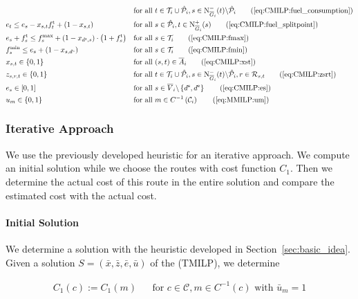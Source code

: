 \begin{align}
	& & & \text{for all } t\in\Ti\cup\Phat_i, s\in\Ninoi(t)\backslash\Phat_i \tag{\ref{eq:CMILP:fuel_consumption}} \\
	& e_t \leq e_s-x_{s,t}\ft_t+\left(1-x_{s,t}\right) && \text{for all } s\in\Phat_i,t\in\Noutoi(s) \tag{\ref{eq:CMILP:fuel_splitpoint}} \\
	& e_s + \ft_s \leq f^{\max}_s + \left(1-x_{\ds,s}\right)\cdot\left(1+\ft_s\right) && \text{for all } s\in\Ti \tag{\ref{eq:CMILP:fmax}} \\
	& f^{\min}_s \leq e_s + \left(1-x_{s,\de}\right) && \text{for all } s\in\Ti \tag{\ref{eq:CMILP:fmin}} \\
	& x_{s,t}\in\{0,1\} & & \text{for all } (s,t)\in\overline{A}_i \tag{\ref{eq:CMILP:xst}} \\
	& z_{s,r,t}\in\{0,1\} & & \text{for all } t\in\Ti\cup\Phat_i,s\in\Ninoi(t)\backslash\Phat_i,r\in\Rst \tag{\ref{eq:CMILP:zsrt}} \\
	& e_s\in[0,1] & & \text{for all } s\in\overline{V}_i\backslash\left\{\ds,\de\right\} \tag{\ref{eq:CMILP:es}} \\
	& u_m\in\{0,1\} && \text{for all } m\in C^{-1}\left(\mathcal{C}_i\right) \tag{\ref{eq:MMILP:um}}
\end{align}


\subsubsection{Iterative Approach}

We use the previously developed heuristic for an iterative approach. We compute an initial solution while we choose the routes with cost function $C_1$. Then we determine the actual cost of this route in the entire solution and compare the estimated cost with the actual cost.

\paragraph{Initial Solution} \parfill

We determine a solution with the heuristic developed in Section~\ref{sec:basic_idea}. Given a solution $S=\left(\bar{x},\bar{z},\bar{e},\bar{u}\right)$ of the (TMILP), we determine 

\begin{align*}
	C_1(c) := C_1(m) && \text{for } c\in\mathcal{C}, m\in C^{-1}(c) \text{ with } \bar{u}_m = 1
\end{align*}

